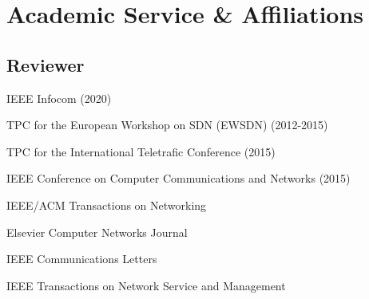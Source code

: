 \documentclass[11pt, a4paper]{article}
\newcommand{\Duration}[2]{\fontsize{10pt}{0}\selectfont #1--#2}
\newcommand{\Ongoing}{}
\begin{document}
\section{Academic Service \& Affiliations}

%
%
\subsection{Reviewer}
IEEE Infocom (2020)

TPC for the European Workshop on SDN (EWSDN) (2012-­2015)

TPC for the International Teletrafic Conference (2015)

IEEE Conference on Computer Communications and Networks  (2015)

IEEE/ACM Transactions on Networking

Elsevier Computer Networks Journal

IEEE Communications Letters

IEEE Transactions on Network Service and Management
\end{document}
